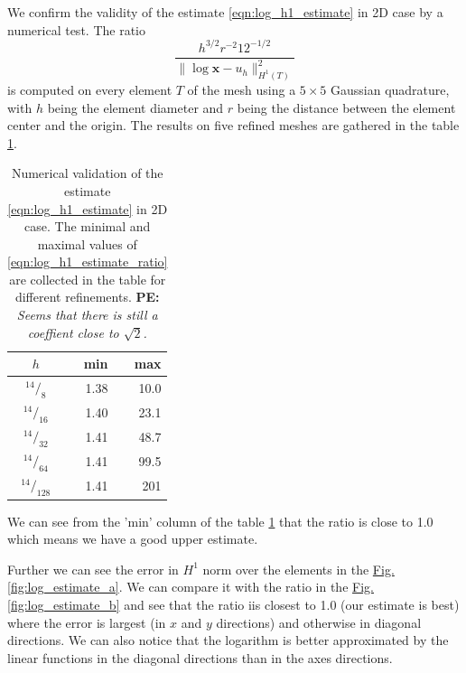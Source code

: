 \documentclass[preprint,12pt]{elsarticle}
\newcommand{\fig}[1]{\hyperref[#1]{Fig.\ref{#1}}}
\def\vc#1{\mathbf{\boldsymbol{#1}}}     %
\newcommand*\rfrac[2]{{}^{#1}\!/_{#2}}
\newcommand{\notePE}[1]{{\color{Orange} \textbf{PE: } \textit{#1}}}
\begin{document}
We confirm the validity of the estimate \eqref{eqn:log_h1_estimate} in 2D case by a numerical test.
The ratio 
\begin{equation} \label{eqn:log_h1_estimate_ratio}
\frac{h^{3/2} r^{-2} 12^{-1/2}}{\|\log \vc x - u_h\|^2_{H^1(T)}}
\end{equation}
is computed on every element $T$ of the mesh using a $5\times5$ Gaussian quadrature, with $h$ being the 
element diameter and $r$ being the distance between the element center and the origin. The results on five
refined meshes are gathered in the table \ref{tab:log_h1_estimate}. 
%
\begin{table}
\begin{center}
\begin{tabular}{crr}
\toprule
$h$    & min & max \\
\midrule
$\rfrac{14}{8}$    & 1.38 & 10.0  \\ %
$\rfrac{14}{16}$   & 1.40 & 23.1  \\ %
$\rfrac{14}{32}$   & 1.41 & 48.7  \\ %
$\rfrac{14}{64}$   & 1.41 & 99.5  \\ %
$\rfrac{14}{128}$  & 1.41 & 201   \\ %
\bottomrule
\end{tabular}
\caption{Numerical validation of the estimate \eqref{eqn:log_h1_estimate} in 2D case. The minimal and maximal 
values of \eqref{eqn:log_h1_estimate_ratio} are collected in the table for different refinements.
\notePE{Seems that there is still a coeffient close to $\sqrt{2}$.}}
\label{tab:log_h1_estimate}
\end{center}
\end{table}
%
We can see from the 'min' column of the table \ref{tab:log_h1_estimate} that the ratio is close to 1.0 which means we
have a good upper estimate. 

Further we can see the error in $H^1$ norm over the elements in the \fig{fig:log_estimate_a}. We can 
compare it with the ratio in the \fig{fig:log_estimate_b} and see that the ratio iis closest to 1.0 
(our estimate is best) where the error is largest 
(in $x$ and $y$ directions) and otherwise in diagonal directions. We can also notice that the logarithm is 
better approximated by the linear functions in the diagonal directions than in the axes directions.
\end{document}
